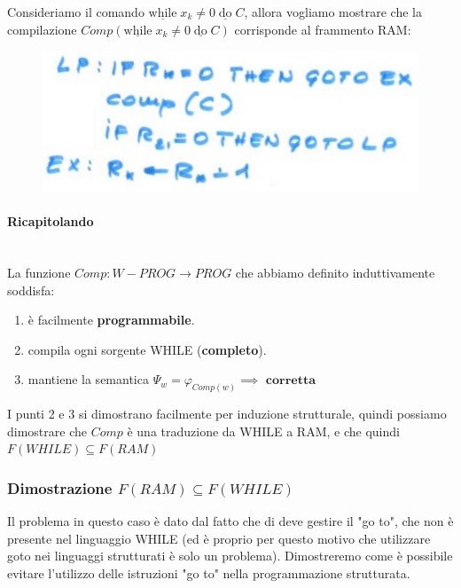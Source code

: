 \documentclass{article}
\begin{document}
\begin{itemize}
          Consideriamo il comando $\underline{\text{while}}\;x_k\neq 0\;\underline{\text{do}}\; C$,
          allora vogliamo mostrare che la compilazione $Comp(\underline{\text{while}}\;x_k\neq 0\;\underline{\text{do}}\; C)$
          corrisponde al frammento RAM:
          \begin{figure}[H]
              \centering
              \includegraphics[scale=0.5]{images/comandowhile_ram.png}
          \end{figure}

          \paragraph{Ricapitolando}\mbox{}\\
          La funzione $Comp:W-PROG\rightarrow PROG$ che abbiamo definito induttivamente soddisfa:
          \begin{enumerate}
              \item è facilmente \textbf{programmabile}.
              \item compila ogni sorgente WHILE (\textbf{completo}).
              \item mantiene la semantica $\Psi_w=\varphi_{Comp(w)}\implies\textbf{ corretta}$
          \end{enumerate}
          I punti 2 e 3 si dimostrano facilmente per induzione strutturale, quindi possiamo dimostrare
          che $Comp$ è una traduzione da WHILE a RAM, e che quindi $F(WHILE)\subseteq F(RAM)$

\end{itemize}

\subsubsection{Dimostrazione $F(RAM)\subseteq F(WHILE)$}
Il problema in questo caso è dato dal fatto che di deve gestire il "go to", che non
è presente nel linguaggio WHILE (ed è proprio per questo motivo che utilizzare
goto nei linguaggi strutturati è solo un problema). Dimostreremo come è possibile evitare l'utilizzo
delle istruzioni "go to" nella programmazione strutturata.
\end{document}
